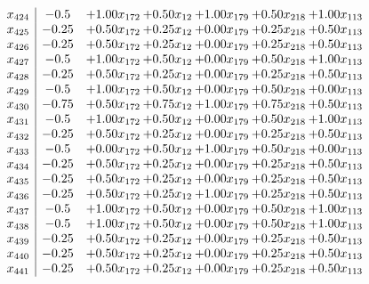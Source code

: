 \documentclass[8pt]{article}
\begin{document}
\[\begin{array}{c| c c@{\hskip 2pt} c@{\hskip 2pt} c@{\hskip 2pt} c@{\hskip 2pt} c@{\hskip 2pt} }
 x_{424}   &  -0.5 & +  1.00 x_{172} & +  0.50 x_{12} & +  1.00 x_{179} & +  0.50 x_{218} & +  1.00 x_{113}\\
 x_{425}   &  -0.25 & +  0.50 x_{172} & +  0.25 x_{12} & +  0.00 x_{179} & +  0.25 x_{218} & +  0.50 x_{113}\\
 x_{426}   &  -0.25 & +  0.50 x_{172} & +  0.25 x_{12} & +  0.00 x_{179} & +  0.25 x_{218} & +  0.50 x_{113}\\
 x_{427}   &  -0.5 & +  1.00 x_{172} & +  0.50 x_{12} & +  0.00 x_{179} & +  0.50 x_{218} & +  1.00 x_{113}\\
 x_{428}   &  -0.25 & +  0.50 x_{172} & +  0.25 x_{12} & +  0.00 x_{179} & +  0.25 x_{218} & +  0.50 x_{113}\\
 x_{429}   &  -0.5 & +  1.00 x_{172} & +  0.50 x_{12} & +  0.00 x_{179} & +  0.50 x_{218} & +  0.00 x_{113}\\
 x_{430}   &  -0.75 & +  0.50 x_{172} & +  0.75 x_{12} & +  1.00 x_{179} & +  0.75 x_{218} & +  0.50 x_{113}\\
 x_{431}   &  -0.5 & +  1.00 x_{172} & +  0.50 x_{12} & +  0.00 x_{179} & +  0.50 x_{218} & +  1.00 x_{113}\\
 x_{432}   &  -0.25 & +  0.50 x_{172} & +  0.25 x_{12} & +  0.00 x_{179} & +  0.25 x_{218} & +  0.50 x_{113}\\
 x_{433}   &  -0.5 & +  0.00 x_{172} & +  0.50 x_{12} & +  1.00 x_{179} & +  0.50 x_{218} & +  0.00 x_{113}\\
 x_{434}   &  -0.25 & +  0.50 x_{172} & +  0.25 x_{12} & +  0.00 x_{179} & +  0.25 x_{218} & +  0.50 x_{113}\\
 x_{435}   &  -0.25 & +  0.50 x_{172} & +  0.25 x_{12} & +  0.00 x_{179} & +  0.25 x_{218} & +  0.50 x_{113}\\
 x_{436}   &  -0.25 & +  0.50 x_{172} & +  0.25 x_{12} & +  1.00 x_{179} & +  0.25 x_{218} & +  0.50 x_{113}\\
 x_{437}   &  -0.5 & +  1.00 x_{172} & +  0.50 x_{12} & +  0.00 x_{179} & +  0.50 x_{218} & +  1.00 x_{113}\\
 x_{438}   &  -0.5 & +  1.00 x_{172} & +  0.50 x_{12} & +  0.00 x_{179} & +  0.50 x_{218} & +  1.00 x_{113}\\
 x_{439}   &  -0.25 & +  0.50 x_{172} & +  0.25 x_{12} & +  0.00 x_{179} & +  0.25 x_{218} & +  0.50 x_{113}\\
 x_{440}   &  -0.25 & +  0.50 x_{172} & +  0.25 x_{12} & +  0.00 x_{179} & +  0.25 x_{218} & +  0.50 x_{113}\\
 x_{441}   &  -0.25 & +  0.50 x_{172} & +  0.25 x_{12} & +  0.00 x_{179} & +  0.25 x_{218} & +  0.50 x_{113}\\

\end{array}\]
\end{document}

